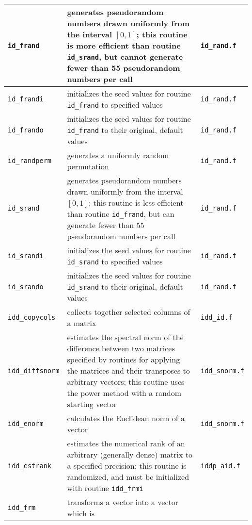 ﻿\documentclass[letterpaper,12pt]{article}
\begin{document}
\begin{center}
%
\tabletail{\hline}
%
\begin{supertabular}{>{\raggedright}p{1.2in} p{.53\textwidth} l}
%
\hline
{\tt id\_frand} & generates pseudorandom numbers drawn uniformly from
the interval $[0,1]$; this routine is more efficient than routine
{\tt id\_srand}, but cannot generate fewer than 55 pseudorandom numbers
per call & {\tt id\_rand.f} \\\hline
%
{\tt id\_frandi} & initializes the seed values for routine
{\tt id\_frand} to specified values & {\tt id\_rand.f} \\\hline
%
{\tt id\_frando} & initializes the seed values for routine
{\tt id\_frand} to their original, default values & {\tt id\_rand.f}
\\\hline
%
{\tt id\_randperm} & generates a uniformly random permutation &
{\tt id\_rand.f} \\\hline
%
{\tt id\_srand} & generates pseudorandom numbers drawn uniformly from
the interval $[0,1]$; this routine is less efficient than routine
{\tt id\_frand}, but can generate fewer than 55 pseudorandom numbers
per call & {\tt id\_rand.f} \\\hline
%
{\tt id\_srandi} & initializes the seed values for routine
{\tt id\_srand} to specified values & {\tt id\_rand.f} \\\hline
%
{\tt id\_srando} & initializes the seed values for routine
{\tt id\_srand} to their original, default values & {\tt id\_rand.f}
\\\hline
%
{\tt idd\_copycols} & collects together selected columns of a matrix &
{\tt idd\_id.f} \\\hline
%
{\tt idd\_diffsnorm} & estimates the spectral norm of the difference
between two matrices specified by routines for applying the matrices
and their transposes to arbitrary vectors; this routine uses the power
method with a random starting vector & {\tt idd\_snorm.f} \\\hline
%
{\tt idd\_enorm} & calculates the Euclidean norm of a vector &
{\tt idd\_snorm.f} \\\hline
%
{\tt idd\_estrank} & estimates the numerical rank of an arbitrary
(generally dense) matrix to a specified precision; this routine is
randomized, and must be initialized with routine {\tt idd\_frmi} &
{\tt iddp\_aid.f} \\\hline
%
{\tt idd\_frm} & transforms a vector into a vector which is

\end{supertabular}
\end{center}
\end{document}
